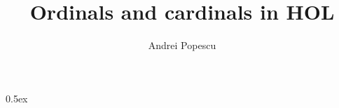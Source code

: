 \documentclass[11pt,a4paper]{article}
\begin{document}
\title{Ordinals and cardinals in HOL}
\author{Andrei Popescu}
\maketitle

\parindent 0pt\parskip 0.5ex


\end{document}
